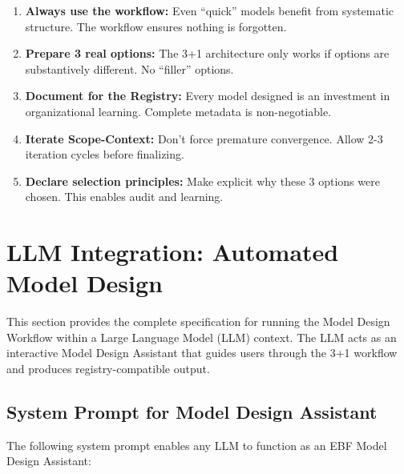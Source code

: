 \begin{tcolorbox}[colback=green!5!white, colframe=green!75!black,
    title=Practical Implications]
\begin{enumerate}
\item \textbf{Always use the workflow:} Even ``quick'' models benefit from
    systematic structure. The workflow ensures nothing is forgotten.
\item \textbf{Prepare 3 real options:} The 3+1 architecture only works if
    options are substantively different. No ``filler'' options.
\item \textbf{Document for the Registry:} Every model designed is an
    investment in organizational learning. Complete metadata is non-negotiable.
\item \textbf{Iterate Scope-Context:} Don't force premature convergence.
    Allow 2-3 iteration cycles before finalizing.
\item \textbf{Declare selection principles:} Make explicit why these 3 options
    were chosen. This enables audit and learning.
\end{enumerate}
\end{tcolorbox}


\section{LLM Integration: Automated Model Design}
\label{sec:eee-llm}

This section provides the complete specification for running the Model Design
Workflow within a Large Language Model (LLM) context. The LLM acts as an
interactive Model Design Assistant that guides users through the 3+1 workflow
and produces registry-compatible output.

\subsection{System Prompt for Model Design Assistant}

The following system prompt enables any LLM to function as an EBF Model Design
Assistant:

